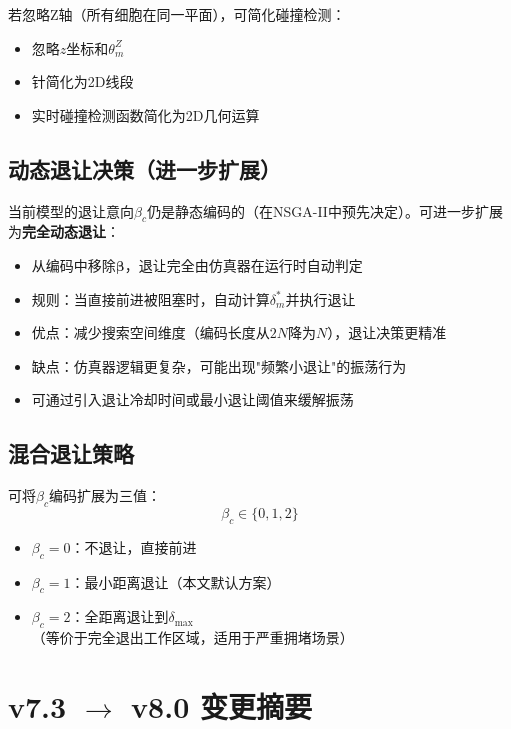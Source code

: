 \documentclass[11pt,a4paper]{article}
\begin{document}
若忽略Z轴（所有细胞在同一平面），可简化碰撞检测：
\begin{itemize}
    \item 忽略$z$坐标和$\theta_m^Z$
    \item 针简化为2D线段
    \item 实时碰撞检测函数简化为2D几何运算
\end{itemize}

\subsection{动态退让决策（进一步扩展）}

当前模型的退让意向$\beta_c$仍是静态编码的（在NSGA-II中预先决定）。可进一步扩展为\textbf{完全动态退让}：
\begin{itemize}
    \item 从编码中移除$\boldsymbol{\beta}$，退让完全由仿真器在运行时自动判定
    \item 规则：当直接前进被阻塞时，自动计算$\delta_m^*$并执行退让
    \item 优点：减少搜索空间维度（编码长度从$2N$降为$N$），退让决策更精准
    \item 缺点：仿真器逻辑更复杂，可能出现"频繁小退让"的振荡行为
    \item 可通过引入退让冷却时间或最小退让阈值来缓解振荡
\end{itemize}

\subsection{混合退让策略}

可将$\beta_c$编码扩展为三值：
\begin{equation}
    \beta_c \in \{0, 1, 2\}
\end{equation}
\begin{itemize}
    \item $\beta_c = 0$：不退让，直接前进
    \item $\beta_c = 1$：最小距离退让（本文默认方案）
    \item $\beta_c = 2$：全距离退让到$\delta_{\max}$（等价于完全退出工作区域，适用于严重拥堵场景）
\end{itemize}

\section{v7.3 $\to$ v8.0 变更摘要}
\end{document}
